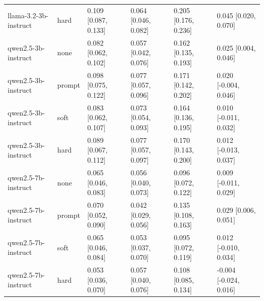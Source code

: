 \begin{tabular}{llllll}
llama-3.2-3b-instruct & hard & 0.109 [0.087, 0.133] & 0.064 [0.046, 0.082] & 0.205 [0.176, 0.236] & 0.045 [0.020, 0.070] \\
qwen2.5-3b-instruct & none & 0.082 [0.062, 0.102] & 0.057 [0.042, 0.076] & 0.162 [0.135, 0.193] & 0.025 [0.004, 0.046] \\
qwen2.5-3b-instruct & prompt & 0.098 [0.075, 0.122] & 0.077 [0.057, 0.096] & 0.171 [0.142, 0.202] & 0.020 [-0.004, 0.046] \\
qwen2.5-3b-instruct & soft & 0.083 [0.062, 0.107] & 0.073 [0.054, 0.093] & 0.164 [0.136, 0.195] & 0.010 [-0.011, 0.032] \\
qwen2.5-3b-instruct & hard & 0.089 [0.067, 0.112] & 0.077 [0.057, 0.097] & 0.170 [0.143, 0.200] & 0.012 [-0.013, 0.037] \\
qwen2.5-7b-instruct & none & 0.065 [0.046, 0.083] & 0.056 [0.040, 0.073] & 0.096 [0.072, 0.122] & 0.009 [-0.011, 0.029] \\
qwen2.5-7b-instruct & prompt & 0.070 [0.052, 0.090] & 0.042 [0.029, 0.056] & 0.135 [0.108, 0.163] & 0.029 [0.006, 0.051] \\
qwen2.5-7b-instruct & soft & 0.065 [0.046, 0.084] & 0.053 [0.037, 0.070] & 0.095 [0.072, 0.119] & 0.012 [-0.010, 0.034] \\
qwen2.5-7b-instruct & hard & 0.053 [0.036, 0.070] & 0.057 [0.040, 0.076] & 0.108 [0.085, 0.134] & -0.004 [-0.024, 0.016] \\
\bottomrule
\end{tabular}
